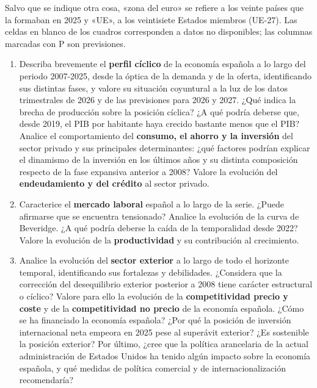 \documentclass[11pt,a4paper]{article}
\begin{document}
\medskip
Salvo que se indique otra cosa, «zona del euro» se refiere a los veinte países que la formaban en 2025 y «UE», a los veintisiete Estados miembros (UE-27). Las celdas en blanco de los cuadros corresponden a datos no disponibles; las columnas marcadas con P son previsiones.

\begin{enumerate}[leftmargin=1.8em, label=\textbf{\arabic*.}, itemsep=7pt]
\item Describa brevemente el \textbf{perfil cíclico} de la economía española a lo largo del periodo 2007-2025, desde la óptica de la demanda y de la oferta, identificando sus distintas fases, y valore su situación coyuntural a la luz de los datos trimestrales de 2026 y de las previsiones para 2026 y 2027. ¿Qué indica la brecha de producción sobre la posición cíclica? ¿A qué podría deberse que, desde 2019, el PIB por habitante haya crecido bastante menos que el PIB? Analice el comportamiento del \textbf{consumo, el ahorro y la inversión} del sector privado y sus principales determinantes: ¿qué factores podrían explicar el dinamismo de la inversión en los últimos años y su distinta composición respecto de la fase expansiva anterior a 2008? Valore la evolución del \textbf{endeudamiento y del crédito} al sector privado.
\item Caracterice el \textbf{mercado laboral} español a lo largo de la serie. ¿Puede afirmarse que se encuentra tensionado? Analice la evolución de la curva de Beveridge. ¿A qué podría deberse la caída de la temporalidad desde 2022? Valore la evolución de la \textbf{productividad} y su contribución al crecimiento.
\item Analice la evolución del \textbf{sector exterior} a lo largo de todo el horizonte temporal, identificando sus fortalezas y debilidades. ¿Considera que la corrección del desequilibrio exterior posterior a 2008 tiene carácter estructural o cíclico? Valore para ello la evolución de la \textbf{competitividad precio y coste} y de la \textbf{competitividad no precio} de la economía española. ¿Cómo se ha financiado la economía española? ¿Por qué la posición de inversión internacional neta empeora en 2025 pese al superávit exterior? ¿Es sostenible la posición exterior? Por último, ¿cree que la política arancelaria de la actual administración de Estados Unidos ha tenido algún impacto sobre la economía española, y qué medidas de política comercial y de internacionalización recomendaría?

\end{enumerate}
\end{document}
